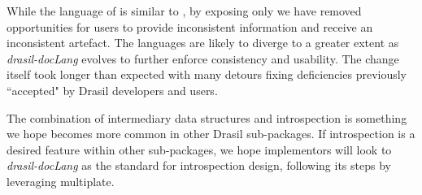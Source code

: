 While the language of  is similar to , by exposing only  we have removed opportunities for users to provide inconsistent information and receive an inconsistent artefact. The languages are likely to diverge to a greater extent as \textit{drasil-docLang} evolves to further enforce consistency and usability. The change itself took longer than expected with many detours fixing deficiencies previously ``accepted" by Drasil developers and users. 

The combination of intermediary data structures and introspection is something we hope becomes more common in other Drasil sub-packages. If introspection is a desired feature within other sub-packages, we hope implementors will look to \textit{drasil-docLang} as the standard for introspection design, following its steps by leveraging multiplate.


